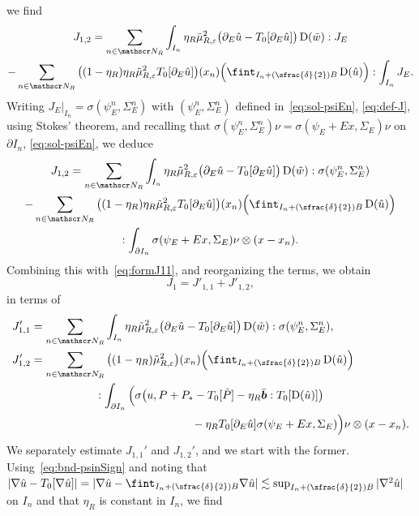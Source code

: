 \documentclass[JEP,XML,SOM,Unicode,published]{cedram}
\let\mathcal\mathscr
\newcommand{\Psfrac}[2]{(\sfrac{#1}{#2})}
\theoremstyle{plain}
\theoremstyle{definition}
\newcommand{\e}{\varepsilon}
\newcommand{\Nc}{\mathcal N}
\newcommand{\D}{\operatorname{D}}
\newcommand{\bb}{\bar{\boldsymbol b}}
\begin{document}
we find
\begin{multline*}
J_{1,2}=\sum_{n\in\Nc_R}\int_{I_n}\eta_R\tilde\mu_{R,\e}^2\big(\partial_E\hat u-T_0[\partial_E\hat u]\big)\D(\tilde w):J_E\\
-\sum_{n\in\Nc_R}\big((1-\eta_R)\eta_R\tilde\mu_{R,\e}^2T_0[\partial_E\hat u]\big)(x_n)\Big(\fint_{I_n+\Psfrac\delta2 B}\D(\hat u)\Big):\int_{I_n}J_E.
\end{multline*}
Writing $J_E|_{I_n}=\sigma(\psi_E^n,\Sigma_E^n)$ with $(\psi_E^n,\Sigma_E^n)$ defined in~\eqref{eq:sol-psiEn}, \cf \eqref{eq:def-J}, using Stokes' theorem,
and recalling that $\sigma(\psi_E^n,\Sigma_E^n)\nu=\sigma(\psi_E+Ex,\Sigma_E)\nu$ on $\partial I_n$, \cf \eqref{eq:sol-psiEn},
we deduce
\begin{multline*}
J_{1,2}=\sum_{n\in\Nc_R}\int_{I_n}\eta_R\tilde\mu_{R,\e}^2\big(\partial_E\hat u-T_0[\partial_E\hat u]\big)\D(\tilde w):\sigma(\psi_E^n,\Sigma_E^n)\\
-\sum_{n\in\Nc_R}\big((1-\eta_R)\eta_R\tilde\mu_{R,\e}^2T_0[\partial_E\hat u]\big)(x_n)\Big(\fint_{I_n+\Psfrac\delta2 B}\D(\hat u)\Big)\\
:\int_{\partial I_n}\sigma(\psi_E+Ex,\Sigma_E)\nu\otimes(x-x_n).
\end{multline*}
Combining this with~\eqref{eq:formJ11}, and reorganizing the terms, we obtain
\begin{equation*}
J_1=J'_{1,1}+J'_{1,2},
\end{equation*}
in terms of
\begin{align*}
J'_{1,1}&= \sum_{n\in\Nc_R}\int_{I_n}\eta_R\tilde\mu_{R,\e}^2\big(\partial_E\hat u-T_0[\partial_E\hat u]\big)\D(\tilde w):\sigma(\psi_E^n,\Sigma_E^n),\\
J'_{1,2}&= \sum_{n\in\Nc_R}\big((1-\eta_R)\tilde\mu_{R,\e}^2\big)(x_n)\Big(\fint_{I_n+\Psfrac\delta2 B}\D(\hat u)\Big)\\
&\hspace{2cm}:\int_{\partial I_n}\Big(\sigma\big(u,P+P_*-T_0[\hat P]-\eta_R\bb:T_0[\D(\hat u)]\big)\\
&\hspace{5 cm}-\eta_R T_0[\partial_E\hat u]\sigma(\psi_E+Ex,\Sigma_E)\Big)\nu\otimes(x-x_n).
\end{align*}
We separately estimate $J_{1,1}'$ and $J_{1,2}'$, and we start with the former.
Using~\eqref{eq:bnd-psinSign} and noting that $|\nabla\hat u-T_0[\nabla\hat u]|=|\nabla\hat u-\fint_{I_n+\Psfrac\delta2 B}\nabla\hat u|\lesssim\sup_{I_n+\Psfrac\delta2 B}|\nabla^2\hat u|$ on $I_n$ and that $\eta_R$ is constant in $I_n$, we find
\end{document}
